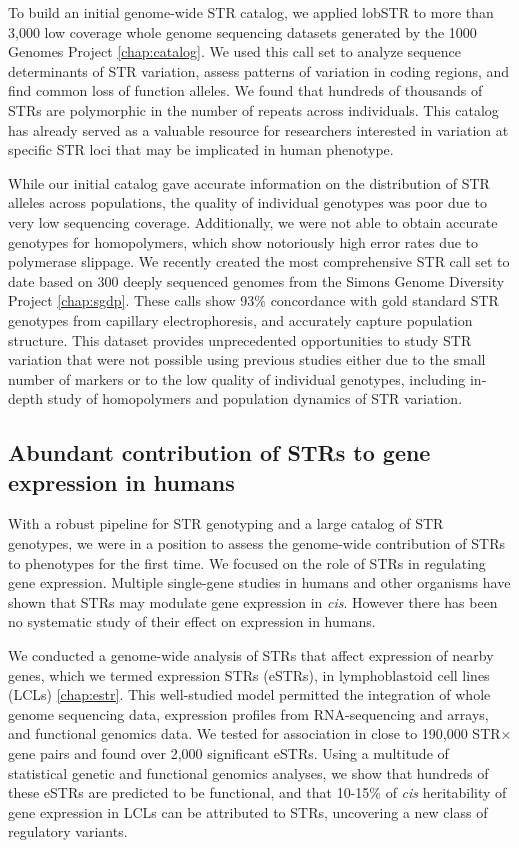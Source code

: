 To build an initial genome-wide STR catalog, we applied lobSTR to more than 3,000 low coverage whole genome sequencing datasets generated by the 1000 Genomes Project \cite{WillemsGymrekHighnamEtAl2014} \autoref{chap:catalog}. We used this call set to analyze sequence determinants of STR variation, assess patterns of variation in coding regions, and find common loss of function alleles. We found that hundreds of thousands of STRs are polymorphic in the number of repeats across individuals. This catalog has already served as a valuable resource for researchers interested in variation at specific STR loci that may be implicated in human phenotype. 

While our initial catalog gave accurate information on the distribution of STR alleles across populations, the quality of individual genotypes was poor due to very low sequencing coverage. Additionally, we were not able to obtain accurate genotypes for homopolymers, which show notoriously high error rates due to polymerase slippage. We recently created the most comprehensive STR call set to date based on 300 deeply sequenced genomes from the Simons Genome Diversity Project \autoref{chap:sgdp}. These calls show 93\% concordance with gold standard STR genotypes from capillary electrophoresis, and accurately capture population structure. This dataset provides unprecedented opportunities to study STR variation that were not possible using previous studies either due to the small number of markers or to the low quality of individual genotypes, including in-depth study of homopolymers and population dynamics of STR variation.

\subsection{Abundant contribution of STRs to gene expression in humans}
With a robust pipeline for STR genotyping and a large catalog of STR genotypes, we were in a position to assess the genome-wide contribution of STRs to phenotypes for the first time. We focused on the role of STRs in regulating gene expression. Multiple single-gene studies in humans and other organisms have shown that STRs may modulate gene expression in \emph{cis}. However there has been no systematic study of their effect on expression in humans.

We conducted a genome-wide analysis of STRs that affect expression of nearby genes, which we termed expression STRs (eSTRs), in lymphoblastoid cell lines (LCLs) \cite{GymrekWillemsGuilmatreEtAl2015} \autoref{chap:estr}. This well-studied model permitted the integration of whole genome sequencing data, expression profiles from RNA-sequencing and arrays, and functional genomics data. We tested for association in close to 190,000 STR$\times$gene pairs and found over 2,000 significant eSTRs. Using a multitude of statistical genetic and functional genomics analyses, we show that hundreds of these eSTRs are predicted to be functional, and that 10-15\% of \emph{cis} heritability of gene expression in LCLs can be attributed to STRs, uncovering a new class of regulatory variants.

